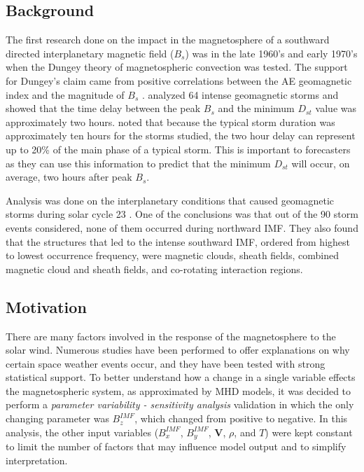 \subsection{Background}
The first research done on the impact in the magnetosphere of a southward
directed interplanetary magnetic field ($B_s$) was in the late 1960's and early
1970's when the Dungey theory of magnetospheric convection was tested. The
support for Dungey's claim came from positive correlations between the AE geomagnetic index and the
magnitude of $B_s$ \citep{Maezawa1976}. \citet{Gonzalez2005} analyzed 64 intense
geomagnetic storms and showed that the time delay between the
peak $B_s$ and the minimum $D_{st}$ value was approximately two hours. \citet{Gonzalez2005}
noted that because the typical storm duration was approximately ten hours for
the storms studied, the two hour delay can represent up to 20\% of the main
phase of a typical storm. This is important to forecasters as they can use this
information to predict that the minimum $D_{st}$ will occur, on average, two
hours after peak $B_s$.

Analysis was done on the interplanetary conditions that caused
geomagnetic storms during solar cycle 23 \citep{Echer2008}. One
of the conclusions was that out of the 90 storm events considered, none
of them occurred during northward IMF. They also found that the structures that
led to the intense southward IMF, ordered from highest to lowest occurrence
frequency, were magnetic clouds, sheath fields, combined magnetic cloud and
sheath fields, and co-rotating interaction regions.

\subsection{Motivation}
There are many factors involved in the response of the magnetosphere to the
solar wind. Numerous studies have been performed to offer
explanations on why certain space weather events occur, and they have been
tested with strong statistical support. To better understand how a change in a single variable effects the
magnetospheric system, as approximated by MHD models, it was decided to perform
a \textit{parameter variability - sensitivity analysis} validation in which the
only changing parameter was $B_z^{IMF}$, which changed from positive to negative.
In this analysis, the other input variables ($B_x^{IMF}$, $B_y^{IMF}$,
$\mathbf{V}$, $\rho$, and $T$) were kept constant to limit the number of
factors that may influence model output and to simplify
interpretation.

